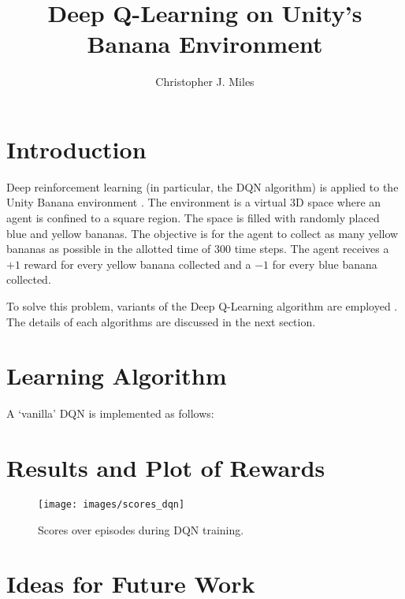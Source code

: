 \documentclass[12]{article}
\begin{document}
\title{Deep Q-Learning on Unity's Banana Environment}
\author{Christopher J. Miles}
\maketitle





\section{Introduction}

Deep reinforcement learning (in particular, the DQN algorithm) is applied to the Unity Banana environment \cite{unity}.  The environment is a virtual 3D space where an agent is confined to a square region. The space is filled with randomly placed blue and yellow bananas. The objective is for the agent to collect as many yellow bananas as possible in the allotted time of 300 time steps. The agent receives a $+1$ reward for every yellow banana collected and a $-1$ for every blue banana collected. 

To solve this problem, variants of the Deep Q-Learning algorithm are employed \cite{Wang2016,Schaul2016,Mnih2015}. The details of each algorithms are discussed in the next section.

\section{Learning Algorithm}

A `vanilla' DQN \cite{Mnih2015} is implemented as follows:

\section{Results and Plot of Rewards}

\begin{figure}
\texttt{[image: images/scores\_dqn]}
\caption{Scores over episodes during DQN training.}
\end{figure}

\section{Ideas for Future Work}




\end{document}
